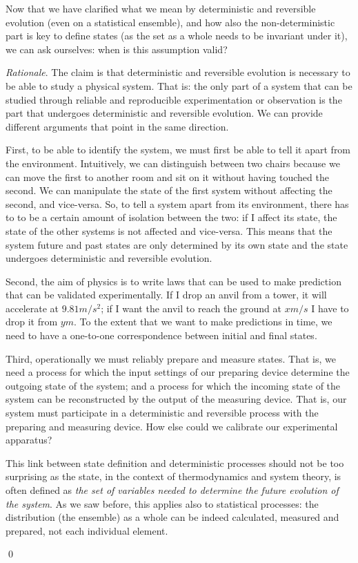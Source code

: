 \documentclass[aps,pra,10pt,twocolumn,floatfix,nofootinbib]{revtex4-1}
\theoremstyle{definition}
\newenvironment{rationale}{\emph{Rationale}.}{\qed}
\begin{document}
Now that we have clarified what we mean by deterministic and reversible evolution (even on a statistical ensemble), and how also the non-deterministic part is key to define states (as the set as a whole needs to be invariant under it), we can ask ourselves: when is this assumption valid?

\begin{rationale}
The claim is that deterministic and reversible evolution is necessary to be able to study a physical system. That is: the only part of a system that can be studied through reliable and reproducible experimentation or observation is the part that undergoes deterministic and reversible evolution. We can provide different arguments that point in the same direction.

First, to be able to identify the system, we must first be able to tell it apart from the environment. Intuitively, we can distinguish between two chairs because we can move the first to another room and sit on it without having touched the second. We can manipulate the state of the first system without affecting the second, and vice-versa. So, to tell a system apart from its environment, there has to to be a certain amount of isolation between the two: if I affect its state, the state of the other systems is not affected and vice-versa. This means that the system future and past states are only determined by its own state and the state undergoes deterministic and reversible evolution.

Second, the aim of physics is to write laws that can be used to make prediction that can be validated experimentally. If I drop an anvil from a tower, it will accelerate at $9.81 m/s^2$; if I want the anvil to reach the ground at $x m/s$ I have to drop it from $y m$. To the extent that we want to make predictions in time, we need to have a one-to-one correspondence between initial and final states.

Third, operationally we must reliably prepare and measure states. That is, we need a process for which the input settings of our preparing device determine the outgoing state of the system; and a process for which the incoming state of the system can be reconstructed by the output of the measuring device. That is, our system must participate in a deterministic and reversible process with the preparing and measuring device. How else could we calibrate our experimental apparatus?

This link between state definition and deterministic processes should not be too surprising as the state, in the context of thermodynamics and system theory, is often defined as \emph{the set of variables needed to determine the future evolution of the system}. As we saw before, this applies also to statistical processes: the distribution (the ensemble) as a whole can be indeed calculated, measured and prepared, not each individual element.


\end{rationale}
\end{document}
